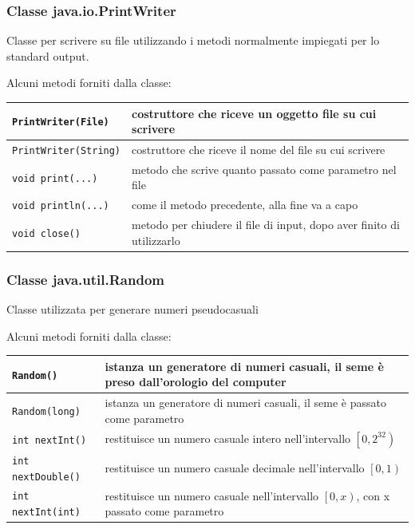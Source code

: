 \documentclass[a4paper]{article}
\begin{document}
\newpage


\subsubsection*{Classe java.io.PrintWriter}
Classe per scrivere su file utilizzando i metodi normalmente impiegati per lo standard output.

Alcuni metodi forniti dalla classe:
\begin{center}
	\begin{tabularx}{\textwidth}{l X}
		\toprule
		\verb|PrintWriter(File)| & costruttore che riceve un oggetto file su cui scrivere \\
		\midrule
		\verb|PrintWriter(String)| & costruttore che riceve il nome del file su cui scrivere \\
		\midrule
		\verb|void print(...)| & metodo che scrive quanto passato come parametro nel file \\
		\midrule
		\verb|void println(...)| & come il metodo precedente, alla fine va a capo \\
		\midrule
		\verb|void close()| & metodo per chiudere il file di input, dopo aver finito di utilizzarlo \\
		\bottomrule
	\end{tabularx}
\end{center}

\subsubsection*{Classe java.util.Random}
Classe utilizzata per generare numeri pseudocasuali

Alcuni metodi forniti dalla classe:
\begin{center}
	\begin{tabularx}{\textwidth}{l X}
		\toprule
		\verb|Random()| & istanza un generatore di numeri casuali, il seme è preso dall'orologio del computer \\
		\midrule
		\verb|Random(long)| & istanza un generatore di numeri casuali, il seme è passato come parametro \\
		\midrule
		\verb|int nextInt()| & restituisce un numero casuale intero nell'intervallo \(\left[0, 2^{32}\right)\) \\
		\midrule
		\verb|int nextDouble()| & restituisce un numero casuale decimale nell'intervallo \(\left[0, 1\right)\)\\
		\midrule
		\verb|int nextInt(int)| & restituisce un numero casuale nell'intervallo \(\left[0, x\right)\), con x passato come parametro \\
		\bottomrule
	\end{tabularx}
\end{center}
\end{document}
